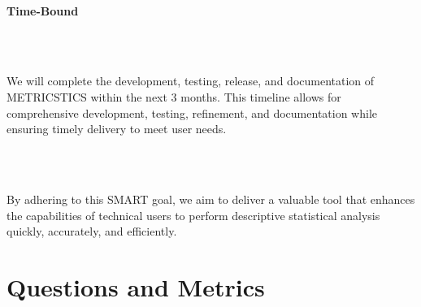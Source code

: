     \strut \\
    \textbf{\large Time-Bound}
    \strut \\
    \strut \\
    We will complete the development, testing, release, and documentation of METRICSTICS within the next 3 months. This timeline allows for comprehensive development, testing, refinement, and documentation while ensuring timely delivery to meet user needs.
    \strut \\
    \strut \\
    By adhering to this SMART goal, we aim to deliver a valuable tool that enhances the capabilities of technical users to perform descriptive statistical analysis quickly, accurately, and efficiently.
    
    \pagebreak

    \section{Questions and Metrics}
    

